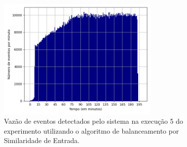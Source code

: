 


\begin{figure}[h]
\centering
\includegraphics[width=0.7\textwidth]{figuras/graphics/histogram_vazao_10-dez-is.png}
\caption{Vazão de eventos detectados pelo sistema na execução 5 do experimento utilizando o algoritmo de balanceamento por Similaridade de Entrada.}
\label{fig:vazao_10-dez-is}
\end{figure}



